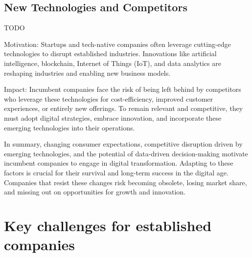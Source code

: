 \documentclass[a4]{scrartcl}
\begin{document}
\subsection{New Technologies and Competitors} \label{subsec:NewTechnologiesandCompetitors}

TODO

Motivation: Startups and tech-native companies often leverage cutting-edge technologies to disrupt established industries. Innovations like artificial intelligence, blockchain, Internet of Things (IoT), and data analytics are reshaping industries and enabling new business models.



Impact: Incumbent companies face the risk of being left behind by competitors who leverage these technologies for cost-efficiency, improved customer experiences, or entirely new offerings. To remain relevant and competitive, they must adopt digital strategies, embrace innovation, and incorporate these emerging technologies into their operations.
	
	
	
	
	
	In summary, changing consumer expectations, competitive disruption driven by emerging technologies, and the potential of data-driven decision-making motivate incumbent companies to engage in digital transformation. Adapting to these factors is crucial for their survival and long-term success in the digital age. Companies that resist these changes risk becoming obsolete, losing market share, and missing out on opportunities for growth and innovation.
	
	








\section{Key challenges for established companies} \label{sec:Sec2}












\end{document}
